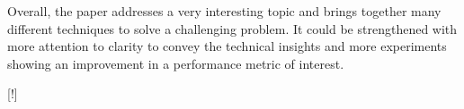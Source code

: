 \documentclass[10pt]{letter}
\begin{document}
Overall, the paper addresses a very interesting topic and brings together many different techniques to solve a challenging problem. It could be strengthened with more attention to clarity to convey the technical insights and more experiments showing an improvement in a performance metric of interest.

{\color{blue} 

{\hspace*{-4.5em}{[R2:12]}\vspace*{-1.9em}}

[!]}


\vspace{1em}



\vspace{2em}
\end{document}
